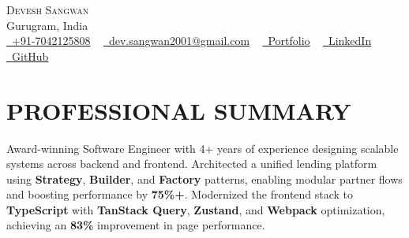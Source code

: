 \documentclass[letterpaper,11pt]{article}
\begin{document}
\begin{center}
    {\Huge \scshape Devesh Sangwan} \\ \vspace{1pt}
    Gurugram, India \\
    \small \href{tel:+91-7042125808}{\raisebox{-0.1\height}\faPhone~+91-7042125808} ~
    \href{mailto:dev.sangwan2001@gmail.com}{\raisebox{-0.2\height}\faEnvelope~dev.sangwan2001@gmail.com} ~
    \href{https://deveshsangwan.com}{\raisebox{-0.1\height}{\faGlobe}~Portfolio} ~
    \href{https://www.linkedin.com/in/deveshsangwan/}{\raisebox{-0.2\height}\faLinkedin~LinkedIn} ~
    \href{https://github.com/deveshsangwan}{\raisebox{-0.2\height}\faGithub~GitHub}
\end{center}


\section{PROFESSIONAL SUMMARY}
\vspace{-2pt}
\small{Award-winning Software Engineer with 4+ years of experience designing scalable systems across backend and frontend. Architected a unified lending platform using \textbf{Strategy}, \textbf{Builder}, and \textbf{Factory} patterns, enabling modular partner flows and boosting performance by \textbf{75\%+}. Modernized the frontend stack to \textbf{TypeScript} with \textbf{TanStack Query}, \textbf{Zustand}, and \textbf{Webpack} optimization, achieving an \textbf{83\%} improvement in page performance.}


\end{document}
